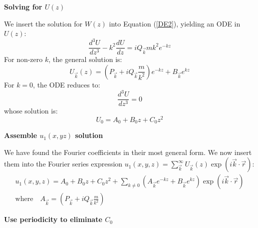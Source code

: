 \documentclass[12pt, a4paper, twoside, openright]{book}
\begin{document}
\textbf{Solving for $U(z)$}

We insert the solution for $W(z)$ into Equation (\ref{DE2}), yielding an ODE in $U(z)$:
\begin{equation}
\frac{d^3 U}{dz^3} - k^2 \frac{d U}{dz} = i Q_{\vec{k}} m k^2 e^{-kz} 
\end{equation}
For non-zero $k$, the general solution is:
\begin{equation}
U_{\vec{k}}(z) = \left( P_{\vec{k}} + i Q_{\vec{k}} \frac{m}{k^2} \right) e^{-kz}
+ B_{\vec{k}} e^{kz}
\end{equation}
For $k = 0$, the ODE reduces to:
\begin{equation}
\frac{d^3 U}{dz^3} = 0
\end{equation}
whose solution is:
\begin{equation}
U_0 = A_0 + B_0 z + C_0 z^2
\end{equation}


\textbf{Assemble $u_1(x,yz)$ solution}

We have found the Fourier coefficients in their most general form.  We now insert them into the Fourier series expression $ u_1(x,y,z) = \sum_{\vec{k}}^{\infty} U_{\vec{k}}(z) \exp(i \vec{k}\cdot \vec{r}) $:
\begin{gather}
u_1(x,y,z) = A_0 + B_0 z + C_0 z^2 + \sum_{k \neq 0} 
\left(  A_{\vec{k}} e^{-kz} + B_{\vec{k}} e^{kz} \right)
\exp(i \vec{k}\cdot \vec{r})\\
\text{where} \quad
A_{\vec{k}} = \left( P_{\vec{k}} + i Q_{\vec{k}} \frac{m}{k^2} \right)
\end{gather}

\textbf{Use periodicity to eliminate $C_0$}
\end{document}
